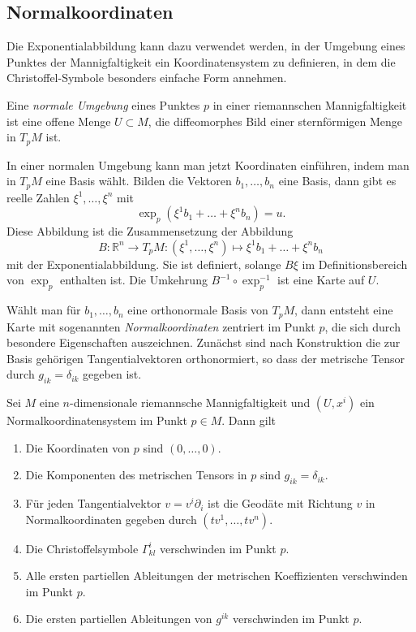 %
%
\subsection{Normalkoordinaten}
Die Exponentialabbildung kann dazu verwendet werden, in der
Umgebung eines Punktes der Mannigfaltigkeit ein Koordinatensystem
zu definieren, in dem die Christoffel-Symbole besonders einfache
Form annehmen.

\begin{definition}
Eine \emph{normale Umgebung} eines Punktes $p$ in einer 
riemannschen Mannigfaltigkeit ist eine offene Menge $U\subset M$,
die diffeomorphes Bild einer sternförmigen Menge in $T_pM$ ist.
\end{definition}

In einer normalen Umgebung kann man jetzt Koordinaten einführen,
indem man in $T_pM$ eine Basis wählt.
Bilden die Vektoren $b_1,\dots,b_n$ eine Basis, dann gibt es reelle
Zahlen $\xi^1,\dots,\xi^n$ mit 
\[
\exp_p(\xi^1b_1+\dots+\xi^nb_n)=u.
\]
Diese Abbildung ist die Zusammensetzung der 
Abbildung
\[
B
\colon
\mathbb{R}^n \to T_pM
:
(\xi^1,\dots,\xi^n)
\mapsto
\xi^1b_1+\dots+\xi^nb_n
\]
mit der Exponentialabbildung.
Sie ist definiert, solange $B\xi$ im Definitionsbereich von $\exp_p$
enthalten ist.
Die Umkehrung $B^{-1}\circ\exp_p^{-1}$ ist eine Karte auf $U$.

Wählt man für $b_1,\dots,b_n$ eine orthonormale Basis von $T_pM$,
dann entsteht eine Karte mit sogenannten \emph{Normalkoordinaten}
zentriert im Punkt $p$,
die sich durch besondere Eigenschaften auszeichnen.
Zunächst sind nach Konstruktion die zur Basis gehörigen Tangentialvektoren
orthonormiert, so dass der metrische Tensor durch $g_{ik}=\delta_{ik}$
gegeben ist.

\begin{satz}
\label{zusammenhang:geodaeten:satz:normalkoordinaten}
Sei $M$ eine $n$-dimensionale riemannsche Mannigfaltigkeit und $(U,x^i)$
ein Normalkoordinatensystem im Punkt $p\in M$.
Dann gilt
\begin{enumerate}
\item Die Koordinaten von $p$  sind $(0,\dots,0)$.
\item Die Komponenten des metrischen Tensors in $p$ sind $g_{ik}=\delta_{ik}$.
\item Für jeden Tangentialvektor $v=v^i\partial_i$ ist die Geodäte mit
Richtung $v$ in Normalkoordinaten gegeben durch $(tv^1,\dots,tv^n)$.
\item Die Christoffelsymbole $\Gamma^i_{kl}$ verschwinden im Punkt $p$.
\item Alle ersten partiellen Ableitungen der metrischen Koeffizienten
verschwinden im Punkt $p$.
\item Die ersten partiellen Ableitungen von $g^{ik}$ verschwinden im Punkt $p$.
\end{enumerate}
\end{satz}

